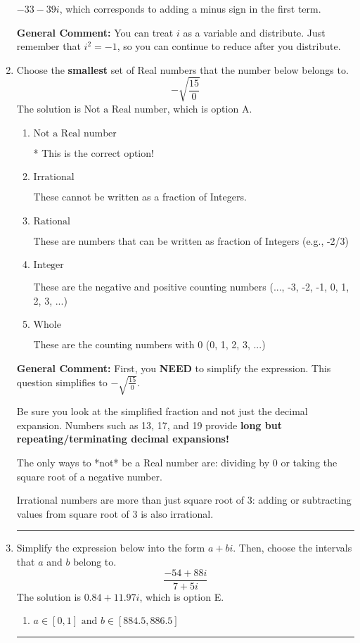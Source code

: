 \documentclass{extbook}[14pt]
\newcommand{\litem}[1]{\item #1

\rule{\textwidth}{0.4pt}}
\begin{document}
\begin{enumerate}
{\begin{enumerate}[label=\Alph*.]
 $-33 - 39 i$, which corresponds to adding a minus sign in the first term.
\end{enumerate}

\textbf{General Comment:} You can treat $i$ as a variable and distribute. Just remember that $i^2=-1$, so you can continue to reduce after you distribute.
}
\litem{
Choose the \textbf{smallest} set of Real numbers that the number below belongs to.
\[ -\sqrt{\frac{15}{0}} \]The solution is \( \text{Not a Real number} \), which is option A.\begin{enumerate}[label=\Alph*.]
\item \( \text{Not a Real number} \)

* This is the correct option!
\item \( \text{Irrational} \)

These cannot be written as a fraction of Integers.
\item \( \text{Rational} \)

These are numbers that can be written as fraction of Integers (e.g., -2/3)
\item \( \text{Integer} \)

These are the negative and positive counting numbers (..., -3, -2, -1, 0, 1, 2, 3, ...)
\item \( \text{Whole} \)

These are the counting numbers with 0 (0, 1, 2, 3, ...)
\end{enumerate}

\textbf{General Comment:} First, you \textbf{NEED} to simplify the expression. This question simplifies to $-\sqrt{\frac{15}{0}}$. 
 
 Be sure you look at the simplified fraction and not just the decimal expansion. Numbers such as 13, 17, and 19 provide \textbf{long but repeating/terminating decimal expansions!} 
 
 The only ways to *not* be a Real number are: dividing by 0 or taking the square root of a negative number. 
 
 Irrational numbers are more than just square root of 3: adding or subtracting values from square root of 3 is also irrational.
}
\litem{
Simplify the expression below into the form $a+bi$. Then, choose the intervals that $a$ and $b$ belong to.
\[ \frac{-54 + 88 i}{7 + 5 i} \]The solution is \( 0.84  + 11.97 i \), which is option E.\begin{enumerate}[label=\Alph*.]
\item \( a \in [0, 1] \text{ and } b \in [884.5, 886.5] \)


\end{enumerate}}
\end{enumerate}
\end{document}
